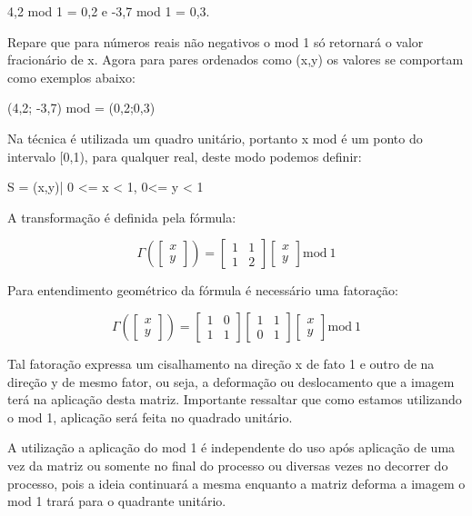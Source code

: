 \documentclass[a4paper, 12pt]{article}
\begin{document}
            4,2 mod 1 = 0,2  e -3,7 mod 1 = 0,3.

Repare que para números reais não negativos o mod 1 só retornará o valor fracionário de x.
Agora para pares ordenados como (x,y) os valores se comportam como exemplos abaixo:

               (4,2; -3,7) mod = (0,2;0,3)

Na técnica é utilizada um quadro unitário, portanto x mod é um ponto do intervalo [0,1), para qualquer real, deste modo podemos definir:

S = {(x,y)| 0 <= x < 1, 0<= y < 1}

A transformação é definida pela fórmula:

$$\Gamma \left(\begin{bmatrix}
x\\
y
\end{bmatrix}\right)=\begin{bmatrix}
1&1\\
1&2
\end{bmatrix}\begin{bmatrix}
x\\
y
\end{bmatrix}\mathrm{mod\ 1}$$

Para entendimento geométrico da fórmula é necessário uma fatoração:

$$\Gamma \left(\begin{bmatrix}
x\\
y
\end{bmatrix}\right)=\begin{bmatrix}
1&0\\
1&1
\end{bmatrix}\begin{bmatrix}
1&1\\
0&1
\end{bmatrix}\begin{bmatrix}
x\\
y
\end{bmatrix}\mathrm{mod\ 1}$$

Tal fatoração expressa um cisalhamento na direção x de fato 1 e outro de na direção y de mesmo fator, ou seja, a deformação ou deslocamento que a imagem terá na aplicação desta matriz. Importante ressaltar que como estamos utilizando o mod 1, aplicação será feita no quadrado unitário.

A utilização a aplicação do mod 1 é independente do uso após aplicação de uma vez da matriz ou somente no final do processo ou diversas vezes no decorrer do processo, pois a ideia continuará a mesma enquanto a matriz deforma a imagem o mod 1 trará para o quadrante unitário.
\end{document}
